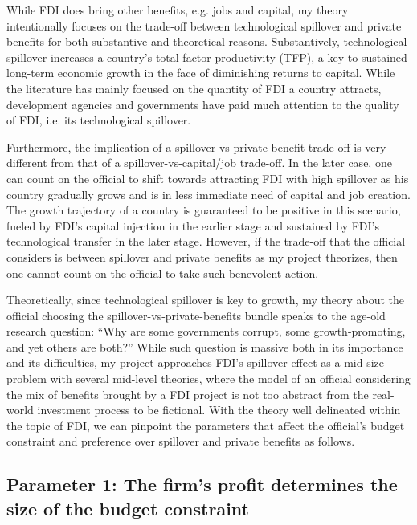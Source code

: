 While FDI does bring other benefits, e.g. jobs and capital, my theory intentionally focuses on the trade-off between technological spillover and private benefits for both substantive and theoretical reasons. Substantively, technological spillover increases a country's total factor productivity (TFP), a key to sustained long-term economic growth in the face of diminishing returns to capital. While the literature has mainly focused on the quantity of FDI a country attracts, development agencies and governments have paid much attention to the quality of FDI, i.e. its technological spillover. 

Furthermore, the implication of a spillover-vs-private-benefit trade-off is very different from that of a spillover-vs-capital/job trade-off. In the later case, one can count on the official to shift towards attracting FDI with high spillover as his country gradually grows and is in less immediate need of capital and job creation. The growth trajectory of a country is guaranteed to be positive in this scenario, fueled by FDI's capital injection in the earlier stage and sustained by FDI's technological transfer in the later stage. However, if the trade-off that the official considers is between spillover and private benefits as my project theorizes, then one cannot count on the official to take such benevolent action.

Theoretically, since technological spillover is key to growth, my theory about the official choosing the spillover-vs-private-benefits bundle speaks to the age-old research question: ``Why are some governments corrupt, some growth-promoting, and yet others are both?'' While such question is massive both in its importance and its difficulties, my project approaches FDI's spillover effect as a mid-size problem with several mid-level theories, where the model of an official considering the mix of benefits brought by a FDI project is not too abstract from the real-world investment process to be fictional. With the theory well delineated within the topic of FDI, we can pinpoint the parameters that affect the official's budget constraint and preference over spillover and private benefits as follows.

\subsection{Parameter 1: The firm's profit determines the size of the budget constraint}
\label{sec:theory_budget_constraint_size}

